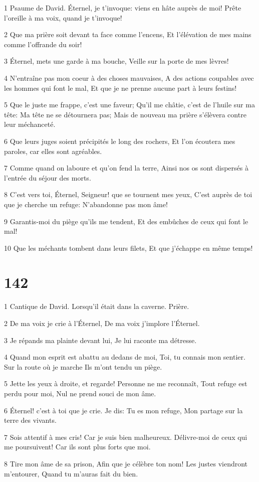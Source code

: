 \par 1 Psaume de David. Éternel, je t'invoque: viens en hâte auprès de moi! Prête l'oreille à ma voix, quand je t'invoque!
\par 2 Que ma prière soit devant ta face comme l'encens, Et l'élévation de mes mains comme l'offrande du soir!
\par 3 Éternel, mets une garde à ma bouche, Veille sur la porte de mes lèvres!
\par 4 N'entraîne pas mon coeur à des choses mauvaises, A des actions coupables avec les hommes qui font le mal, Et que je ne prenne aucune part à leurs festins!
\par 5 Que le juste me frappe, c'est une faveur; Qu'il me châtie, c'est de l'huile sur ma tête: Ma tête ne se détournera pas; Mais de nouveau ma prière s'élèvera contre leur méchanceté.
\par 6 Que leurs juges soient précipités le long des rochers, Et l'on écoutera mes paroles, car elles sont agréables.
\par 7 Comme quand on laboure et qu'on fend la terre, Ainsi nos os sont dispersés à l'entrée du séjour des morts.
\par 8 C'est vers toi, Éternel, Seigneur! que se tournent mes yeux, C'est auprès de toi que je cherche un refuge: N'abandonne pas mon âme!
\par 9 Garantis-moi du piège qu'ils me tendent, Et des embûches de ceux qui font le mal!
\par 10 Que les méchants tombent dans leurs filets, Et que j'échappe en même temps!

\chapter{142}

\par 1 Cantique de David. Lorsqu'il était dans la caverne. Prière.
\par 2 De ma voix je crie à l'Éternel, De ma voix j'implore l'Éternel.
\par 3 Je répands ma plainte devant lui, Je lui raconte ma détresse.
\par 4 Quand mon esprit est abattu au dedans de moi, Toi, tu connais mon sentier. Sur la route où je marche Ils m'ont tendu un piège.
\par 5 Jette les yeux à droite, et regarde! Personne ne me reconnaît, Tout refuge est perdu pour moi, Nul ne prend souci de mon âme.
\par 6 Éternel! c'est à toi que je crie. Je dis: Tu es mon refuge, Mon partage sur la terre des vivants.
\par 7 Sois attentif à mes cris! Car je suis bien malheureux. Délivre-moi de ceux qui me poursuivent! Car ils sont plus forts que moi.
\par 8 Tire mon âme de sa prison, Afin que je célèbre ton nom! Les justes viendront m'entourer, Quand tu m'auras fait du bien.


